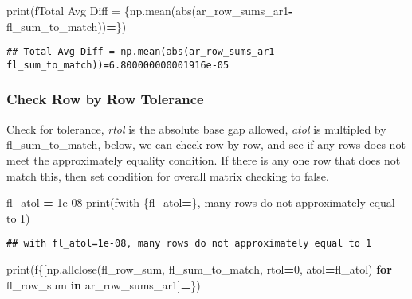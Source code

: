 \documentclass[
]{book}
\newenvironment{Shaded}{\begin{snugshade}}{\end{snugshade}}
\newcommand{\BuiltInTok}[1]{#1}
\newcommand{\ControlFlowTok}[1]{\textcolor[rgb]{0.13,0.29,0.53}{\textbf{#1}}}
\newcommand{\DecValTok}[1]{\textcolor[rgb]{0.00,0.00,0.81}{#1}}
\newcommand{\FloatTok}[1]{\textcolor[rgb]{0.00,0.00,0.81}{#1}}
\newcommand{\KeywordTok}[1]{\textcolor[rgb]{0.13,0.29,0.53}{\textbf{#1}}}
\newcommand{\NormalTok}[1]{#1}
\newcommand{\OperatorTok}[1]{\textcolor[rgb]{0.81,0.36,0.00}{\textbf{#1}}}
\newcommand{\SpecialCharTok}[1]{\textcolor[rgb]{0.00,0.00,0.00}{#1}}
\newcommand{\SpecialStringTok}[1]{\textcolor[rgb]{0.31,0.60,0.02}{#1}}
\begin{document}
\begin{Shaded}
\begin{Highlighting}[]
\BuiltInTok{print}\NormalTok{(}\SpecialStringTok{f\textquotesingle{}Total Avg Diff = }\SpecialCharTok{\{np.}\NormalTok{mean(}\BuiltInTok{abs}\NormalTok{(ar\_row\_sums\_ar1}\OperatorTok{{-}}\NormalTok{fl\_sum\_to\_match))}\OperatorTok{=}\SpecialCharTok{\}}\SpecialStringTok{\textquotesingle{}}\NormalTok{)}
\end{Highlighting}
\end{Shaded}

\begin{verbatim}
## Total Avg Diff = np.mean(abs(ar_row_sums_ar1-fl_sum_to_match))=6.800000000001916e-05
\end{verbatim}

\hypertarget{check-row-by-row-tolerance}{%
\subsubsection{Check Row by Row Tolerance}\label{check-row-by-row-tolerance}}

Check for tolerance, \emph{rtol} is the absolute base gap allowed, \emph{atol} is multipled by fl\_sum\_to\_match, below, we can check row by row, and see if any rows does not meet the approximately equality condition. If there is any one row that does not match this, then set condition for overall matrix checking to false.

\begin{Shaded}
\begin{Highlighting}[]
\NormalTok{fl\_atol }\OperatorTok{=} \FloatTok{1e{-}08}
\BuiltInTok{print}\NormalTok{(}\SpecialStringTok{f\textquotesingle{}with }\SpecialCharTok{\{}\NormalTok{fl\_atol}\OperatorTok{=}\SpecialCharTok{\}}\SpecialStringTok{, many rows do not approximately equal to 1\textquotesingle{}}\NormalTok{)}
\end{Highlighting}
\end{Shaded}

\begin{verbatim}
## with fl_atol=1e-08, many rows do not approximately equal to 1
\end{verbatim}

\begin{Shaded}
\begin{Highlighting}[]
\BuiltInTok{print}\NormalTok{(}\SpecialStringTok{f\textquotesingle{}}\SpecialCharTok{\{}\NormalTok{[np.allclose(fl\_row\_sum, fl\_sum\_to\_match, rtol}\OperatorTok{=}\DecValTok{0}\NormalTok{, atol}\OperatorTok{=}\NormalTok{fl\_atol) }\ControlFlowTok{for}\NormalTok{ fl\_row\_sum }\KeywordTok{in}\NormalTok{ ar\_row\_sums\_ar1]}\OperatorTok{=}\SpecialCharTok{\}}\SpecialStringTok{\textquotesingle{}}\NormalTok{)}
\end{Highlighting}
\end{Shaded}
\end{document}
